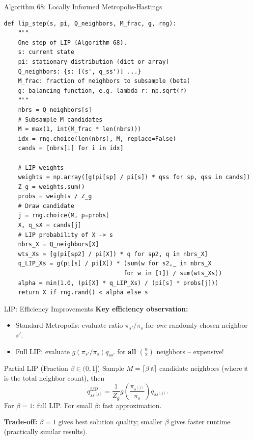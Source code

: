 \documentclass[aspectratio=169,10pt]{beamer}
\begin{document}
\begin{frame}[fragile]{Algorithm 68: Locally Informed Metropolis-Hastings}
  \begin{lstlisting}[style=python]
def lip_step(s, pi, Q_neighbors, M_frac, g, rng):
    """
    One step of LIP (Algorithm 68).
    s: current state
    pi: stationary distribution (dict or array)
    Q_neighbors: {s: [(s', q_ss')] ...}
    M_frac: fraction of neighbors to subsample (beta)
    g: balancing function, e.g. lambda r: np.sqrt(r)
    """
    nbrs = Q_neighbors[s]
    # Subsample M candidates
    M = max(1, int(M_frac * len(nbrs)))
    idx = rng.choice(len(nbrs), M, replace=False)
    cands = [nbrs[i] for i in idx]

    # LIP weights
    weights = np.array([g(pi[sp] / pi[s]) * qss for sp, qss in cands])
    Z_g = weights.sum()
    probs = weights / Z_g
    # Draw candidate
    j = rng.choice(M, p=probs)
    X, q_sX = cands[j]
    # LIP probability of X -> s
    nbrs_X = Q_neighbors[X]
    wts_Xs = [g(pi[sp2] / pi[X]) * q for sp2, q in nbrs_X]
    q_LIP_Xs = g(pi[s] / pi[X]) * (sum(w for s2,_ in nbrs_X
                                  for w in [1]) / sum(wts_Xs))
    alpha = min(1.0, (pi[X] * q_LIP_Xs) / (pi[s] * probs[j]))
    return X if rng.rand() < alpha else s
  \end{lstlisting}
\end{frame}

\begin{frame}{LIP: Efficiency Improvements}
  \textbf{Key efficiency observation:}
  \begin{itemize}
    \item Standard Metropolis: evaluate ratio $\pi_{s'}/\pi_s$ for
      \emph{one} randomly chosen neighbor $s'$.
    \item Full LIP: evaluate $g(\pi_{s'}/\pi_s) q_{ss'}$ for \textbf{all}
      $\binom{n}{2}$ neighbors -- expensive!
  \end{itemize}

  \begin{block}{Partial LIP (Fraction $\beta \in (0,1]$)}
    Sample $M = \lceil \beta\,\mathfrak{n} \rceil$ candidate neighbors
    (where $\mathfrak{n}$ is the total neighbor count), then
    \[
      q^{\mathrm{LIP}}_{ss^{(j)}} = \frac{1}{Z_g}
        g\!\left(\frac{\pi_{s^{(j)}}}{\pi_s}\right) q_{ss^{(j)}}.
    \]
    For $\beta=1$: full LIP.  For small $\beta$: fast approximation.
  \end{block}

  \textbf{Trade-off:} $\beta=1$ gives best solution quality; smaller $\beta$
  gives faster runtime (practically similar results).
\end{frame}
\end{document}
